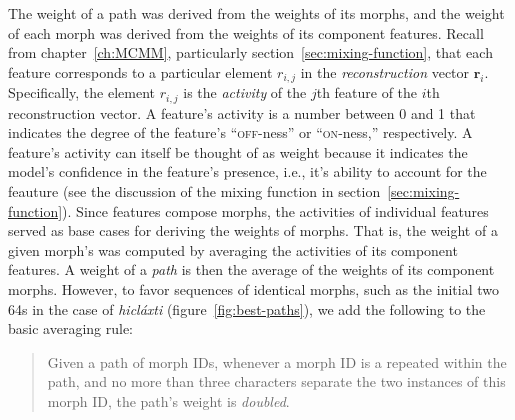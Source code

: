 {The weight of a path was derived from
 the weights of its morphs, and the weight of each morph was derived from the weights of its component features. 
Recall from chapter~\ref{ch:MCMM}, particularly section~\ref{sec:mixing-function}, that each feature corresponds 
to a particular element $r_{i,j}$ in the \emph{reconstruction} 
vector $\mathbf{r}_{i}$. Specifically, the element $r_{i,j}$ is the \emph{activity} 
of the $j$th feature of the $i$th reconstruction vector. A feature's 
activity is a number between 0 and 1 that indicates the degree of the 
feature's ``\textsc{off}-ness'' or ``\textsc{on}-ness,'' respectively. A 
feature's activity can itself be thought of as weight because it indicates 
the model's confidence in the feature's presence, i.e., it's ability to 
account for the feauture (see the discussion of the mixing function in section~\ref{sec:mixing-function}). 
Since features compose morphs, the activities of individual features served as base cases for deriving the weights of morphs. That is, the weight of a given morph's was computed by averaging the activities of its component features. 
A weight of a \emph{path} is then the average of the weights of its component morphs. However, to favor 
sequences of identical morphs, such as the initial two 64s in the case of \textit{hicl\'{a}xti} (figure~\ref{fig:best-paths}), 
we add the following to the basic averaging rule: 
\begin{quote}\noindent
Given a path of morph IDs, 
whenever a morph ID is a repeated within the path, and no more than three characters
separate the two instances of this morph ID, the path's weight is \emph{doubled}.
\end{quote}

}

